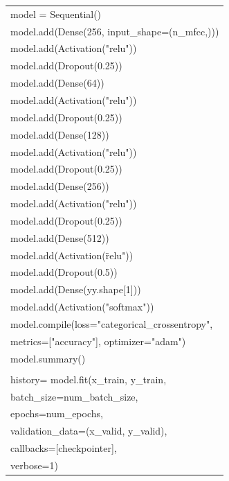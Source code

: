 \documentclass{article}
\begin{document}
\begin{center}
\begin{tabular}{ |l| }
 \hline
model =  Sequential() \\
model.add(Dense(256, input\_shape=(n\_mfcc,))) \\
model.add(Activation("relu")) \\
model.add(Dropout(0.25)) \\
model.add(Dense(64)) \\
model.add(Activation("relu")) \\
model.add(Dropout(0.25)) \\
model.add(Dense(128)) \\
model.add(Activation("relu")) \\
model.add(Dropout(0.25)) \\
model.add(Dense(256)) \\
model.add(Activation("relu")) \\
model.add(Dropout(0.25)) \\
model.add(Dense(512)) \\
model.add(Activation(\"relu")) \\
model.add(Dropout(0.5)) \\
model.add(Dense(yy.shape[1])) \\
model.add(Activation("softmax")) \\
model.compile(loss="categorical\_crossentropy", \\
            metrics=["accuracy"], optimizer="adam") \\
model.summary() \\
\\
history=  model.fit(x\_train, y\_train, \\
            batch\_size=num\_batch\_size, \\
            epochs=num\_epochs, \\
            validation\_data=(x\_valid, y\_valid), \\
            callbacks=[checkpointer], \\
            verbose=1)\\
 \hline
\end{tabular}
\end{center}
\end{document}
